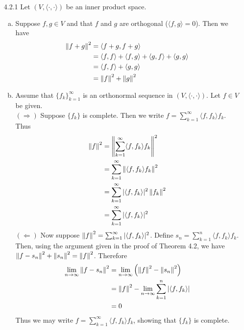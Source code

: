\documentclass[../../Solutions.tex]{subfiles}
\begin{document}
\begin{itemize}
	\item [4.2.1] Let $(V,\langle\cdot,\cdot\rangle)$ be an inner product space.
	\begin{enumerate}[(a)]
		\item Suppose $f,g \in V$ and that $f$ and $g$ are orthogonal ($\langle f,g \rangle = 0$).
			Then we have
			\begin{equation*} \begin{split} 
				\left\lVert f+g\right\rVert^2 &= \langle f+g,f+g \rangle \\
					&= \langle f,f \rangle + \langle f,g \rangle + \langle g,f \rangle + \langle g,g \rangle \\
					&= \langle f,f \rangle + \langle g,g \rangle \\
					&= \left\lVert f\right\rVert^2 + \left\lVert g\right\rVert^2
			\end{split} \end{equation*}
		\item Assume that $\{f_k\}_{k=1}^\infty$ is an orthonormal sequence in $(V,\langle\cdot,\cdot\rangle)$.
			Let $f \in V$ be given. \\
			$(\Rightarrow)$ Suppose $\{f_k\}$ is complete.
			Then we write $f = \sum_{k=1}^\infty \langle f,f_k \rangle f_k$.
			Thus
			\begin{equation*} \begin{split} 
				\left\lVert f\right\rVert^2 &= \left\lVert\sum_{k=1}^\infty \langle f,f_k \rangle f_k\right\rVert^2 \\
					&= \sum_{k=1}^\infty \left\lVert\langle f,f_k \rangle f_k\right\rVert^2 \\
					&= \sum_{k=1}^\infty |\langle f,f_k \rangle|^2 \left\lVert f_k\right\rVert^2 \\
					&= \sum_{k=1}^{\infty} |\langle f,f_k \rangle|^2
			\end{split} \end{equation*}
			$(\Leftarrow)$ Now suppose $\left\lVert f\right\rVert^2 = \sum_{k=1}^\infty |\langle f,f_k \rangle|^2$.
			Define $s_n = \sum_{k=1}^n \langle f,f_k \rangle f_k$.
			Then, using the argument given in the proof of Theorem 4.2, we have $\left\lVert f-s_n\right\rVert^2 + \left\lVert s_n\right\rVert^2 = \left\lVert f\right\rVert^2$.
			Therefore
			\begin{equation*} \begin{split} 
				\lim_{n\to\infty} \left\lVert f-s_n\right\rVert^2 &= \lim_{n\to\infty} \left(\left\lVert f\right\rVert^2 - \left\lVert s_n\right\rVert^2\right) \\
					&= \left\lVert f\right\rVert^2 - \lim_{n\to\infty} \sum_{k=1}^n |\langle f,f_k \rangle| \\
					&= 0
			\end{split} \end{equation*}
			Thus we may write $f = \sum_{k=1}^\infty \langle f,f_k \rangle f_k$, showing that $\{f_k\}$ is complete.
	\end{enumerate}
	

\end{itemize}
\end{document}

